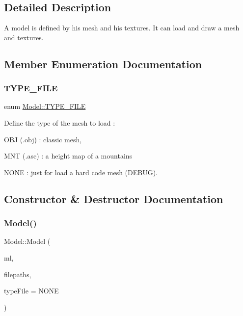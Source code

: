 \subsection{Detailed Description}
A model is defined by his mesh and his textures. It can load and draw a mesh and textures. 

\subsection{Member Enumeration Documentation}
\mbox{\label{class_model_afafb51284e4304b85ccb57452e560318}} 
\subsubsection{\texorpdfstring{T\+Y\+P\+E\+\_\+\+F\+I\+LE}{TYPE\_FILE}}
{\footnotesize\ttfamily enum \mbox{\hyperlink{class_model_afafb51284e4304b85ccb57452e560318}{Model\+::\+T\+Y\+P\+E\+\_\+\+F\+I\+LE}}}



Define the type of the mesh to load \+: 


\begin{DoxyItemize}
\item O\+BJ (.obj) \+: classic mesh,
\item M\+NT (.asc) \+: a height map of a mountains
\item N\+O\+NE \+: just for load a hard code mesh (D\+E\+B\+UG). 
\end{DoxyItemize}

\subsection{Constructor \& Destructor Documentation}
\mbox{\label{class_model_a2ce427936d8b9659f0d269c01481f3bf}} 
\subsubsection{\texorpdfstring{Model()}{Model()}}
{\footnotesize\ttfamily Model\+::\+Model (\begin{DoxyParamCaption}\item[{\mbox{\hyperlink{class_mesh_loader}{Mesh\+Loader}}}]{ml,  }\item[{std\+::vector$<$ std\+::string $>$ const \&}]{filepaths,  }\item[{\mbox{\hyperlink{class_model_afafb51284e4304b85ccb57452e560318}{T\+Y\+P\+E\+\_\+\+F\+I\+LE}}}]{type\+File = {\ttfamily NONE} }\end{DoxyParamCaption})}



